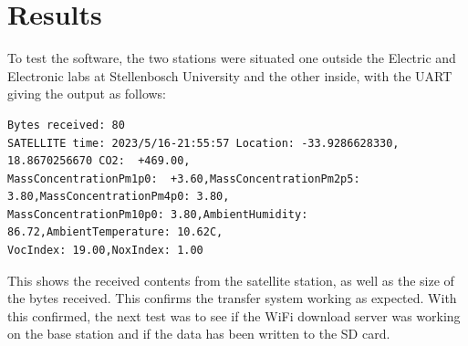   
\chapter{Results}
To test the software, the two stations were situated one outside the Electric and Electronic labs at Stellenbosch University and the other inside, with the UART giving the output as follows:
\begin{lstlisting}
Bytes received: 80
SATELLITE time: 2023/5/16-21:55:57 Location: -33.9286628330, 18.8670256670 CO2:  +469.00,
MassConcentrationPm1p0:  +3.60,MassConcentrationPm2p5: 3.80,MassConcentrationPm4p0: 3.80,
MassConcentrationPm10p0: 3.80,AmbientHumidity: 86.72,AmbientTemperature: 10.62C,
VocIndex: 19.00,NoxIndex: 1.00
\end{lstlisting}
This shows the received contents from the satellite station, as well as the size of the bytes received. This confirms the transfer system working as expected. With this confirmed, the next test was to see if the WiFi download server was working on the base station and if the data has been written to the SD card.





\vspace{-2em}
